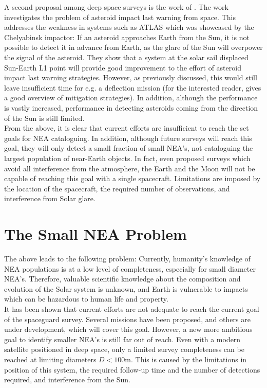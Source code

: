 A second proposal among deep space surveys is the work of \cite{ThesisOlga}. The work investigates the problem of asteroid impact last warning from space. This addresses the weakness in systems such as ATLAS which was showcased by the Chelyabinsk impactor: If an asteroid approaches Earth from the Sun, it is not possible to detect it in advance from Earth, as the glare of the Sun will overpower the signal of the asteroid. They show that a system at the solar sail displaced Sun-Earth L1 point will provide good improvement to the effort of asteroid impact last warning strategies. However, as previously discussed, this would still leave insufficient time for e.g. a deflection mission (for the interested reader, \cite{DefendingEarth} gives a good overview of mitigation strategies). In addition, although the performance is vastly increased, performance in detecting asteroids coming from the direction of the Sun is still limited.\\

From the above, it is clear that current efforts are insufficient to reach the set goals for NEA cataloguing. In addition, although future surveys will reach this goal, they will only detect a small fraction of small NEA's, not cataloguing the largest population of near-Earth objects. In fact, even proposed surveys which avoid all interference from the atmosphere, the Earth and the Moon will not be capable of reaching this goal with a single spacecraft. Limitations are imposed by the location of the spacecraft, the required number of observations, and interference from Solar glare.



\section{The Small NEA Problem}
\label{sec:problemstatement}
The above leads to the following problem: Currently, humanity's knowledge of NEA populations is at a low level of completeness, especially for small diameter NEA's. Therefore, valuable scientific knowledge about the composition and evolution of the Solar system is unknown, and Earth is vulnerable to impacts which can be hazardous to human life and property. \\

It has been shown that current efforts are not adequate to reach the current goal of the spaceguard survey. Several missions have been proposed, and others are under development, which will cover this goal. However, a new more ambitious goal to identify smaller NEA's is still far out of reach. Even with a modern satellite positioned in deep space, only a limited survey completeness can be reached at limiting diameters $D < 100 \mathrm{m}$. This is caused by the limitations in position of this system, the required follow-up time and the number of detections required, and interference from the Sun.

